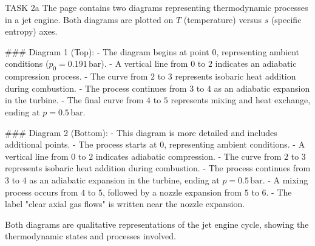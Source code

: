 TASK 2a  
The page contains two diagrams representing thermodynamic processes in a jet engine. Both diagrams are plotted on \( T \) (temperature) versus \( s \) (specific entropy) axes.  

### Diagram 1 (Top):  
- The diagram begins at point \( 0 \), representing ambient conditions (\( p_0 = 0.191 \, \text{bar} \)).  
- A vertical line from \( 0 \) to \( 2 \) indicates an adiabatic compression process.  
- The curve from \( 2 \) to \( 3 \) represents isobaric heat addition during combustion.  
- The process continues from \( 3 \) to \( 4 \) as an adiabatic expansion in the turbine.  
- The final curve from \( 4 \) to \( 5 \) represents mixing and heat exchange, ending at \( p = 0.5 \, \text{bar} \).  

### Diagram 2 (Bottom):  
- This diagram is more detailed and includes additional points.  
- The process starts at \( 0 \), representing ambient conditions.  
- A vertical line from \( 0 \) to \( 2 \) indicates adiabatic compression.  
- The curve from \( 2 \) to \( 3 \) represents isobaric heat addition during combustion.  
- The process continues from \( 3 \) to \( 4 \) as an adiabatic expansion in the turbine, ending at \( p = 0.5 \, \text{bar} \).  
- A mixing process occurs from \( 4 \) to \( 5 \), followed by a nozzle expansion from \( 5 \) to \( 6 \).  
- The label "clear axial gas flows" is written near the nozzle expansion.  

Both diagrams are qualitative representations of the jet engine cycle, showing the thermodynamic states and processes involved.